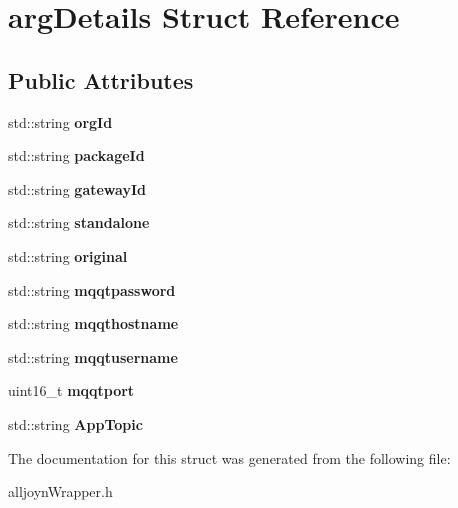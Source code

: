 \hypertarget{structargDetails}{}\section{arg\+Details Struct Reference}
\label{structargDetails}
\subsection*{Public Attributes}
\begin{DoxyCompactItemize}
\item 
std\+::string {\bfseries org\+Id}\hypertarget{structargDetails_ad68a7e3a4671c021314595ad3f2d18fc}{}\label{structargDetails_ad68a7e3a4671c021314595ad3f2d18fc}

\item 
std\+::string {\bfseries package\+Id}\hypertarget{structargDetails_a4761d45ec12007327c86ecdb25c7432d}{}\label{structargDetails_a4761d45ec12007327c86ecdb25c7432d}

\item 
std\+::string {\bfseries gateway\+Id}\hypertarget{structargDetails_a5ec109e9e20fd4a0cdcee937c91f71dd}{}\label{structargDetails_a5ec109e9e20fd4a0cdcee937c91f71dd}

\item 
std\+::string {\bfseries standalone}\hypertarget{structargDetails_a81c636114169bcbd39419b0ee902bcef}{}\label{structargDetails_a81c636114169bcbd39419b0ee902bcef}

\item 
std\+::string {\bfseries original}\hypertarget{structargDetails_afff5e600ffd92c2034f426a806ca4d3c}{}\label{structargDetails_afff5e600ffd92c2034f426a806ca4d3c}

\item 
std\+::string {\bfseries mqqtpassword}\hypertarget{structargDetails_aef9c1f3136e189863c4dadac18769a8b}{}\label{structargDetails_aef9c1f3136e189863c4dadac18769a8b}

\item 
std\+::string {\bfseries mqqthostname}\hypertarget{structargDetails_acf8146591c763231d16d9be5b6f98dd6}{}\label{structargDetails_acf8146591c763231d16d9be5b6f98dd6}

\item 
std\+::string {\bfseries mqqtusername}\hypertarget{structargDetails_a6bc0976d9b8a842b76eda5248b5344c5}{}\label{structargDetails_a6bc0976d9b8a842b76eda5248b5344c5}

\item 
uint16\+\_\+t {\bfseries mqqtport}\hypertarget{structargDetails_a3540e6c26b5b7db1022550a742b821fa}{}\label{structargDetails_a3540e6c26b5b7db1022550a742b821fa}

\item 
std\+::string {\bfseries App\+Topic}\hypertarget{structargDetails_a3baca42607f8ede1029b750603ab0e92}{}\label{structargDetails_a3baca42607f8ede1029b750603ab0e92}

\end{DoxyCompactItemize}


The documentation for this struct was generated from the following file\+:\begin{DoxyCompactItemize}
\item 
alljoyn\+Wrapper.\+h\end{DoxyCompactItemize}
